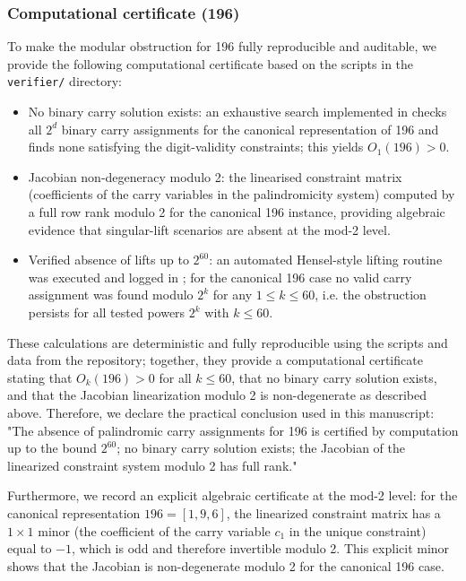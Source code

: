 \documentclass[12pt,a4paper]{article}
\begin{document}
\subsubsection*{Computational certificate (196)}
To make the modular obstruction for 196 fully reproducible and auditable, we provide the following computational certificate based on the scripts in the \texttt{verifier/} directory:
\begin{itemize}
\item No binary carry solution exists: an exhaustive search implemented in \texttt{} checks all $2^d$ binary carry assignments for the canonical representation of 196 and finds none satisfying the digit-validity constraints; this yields $O_1(196)>0$.
\item Jacobian non-degeneracy modulo 2: the linearised constraint matrix (coefficients of the carry variables in the palindromicity system) computed by \texttt{} a full row rank modulo 2 for the canonical 196 instance, providing algebraic evidence that singular-lift scenarios are absent at the mod-2 level.
\item Verified absence of lifts up to $2^{60}$: an automated Hensel-style lifting routine was executed and logged in \texttt{}; for the canonical 196 case no valid carry assignment was found modulo $2^k$ for any $1\le k\le 60$, i.e. the obstruction persists for all tested powers $2^k$ with $k\le 60$.
\end{itemize}

These calculations are deterministic and fully reproducible using the scripts and data from the repository; together, they provide a computational certificate stating that $O_k(196) > 0$ for all $k \leq 60$, that no binary carry solution exists, and that the Jacobian linearization modulo 2 is non-degenerate as described above. Therefore, we declare the practical conclusion used in this manuscript: "The absence of palindromic carry assignments for 196 is certified by computation up to the bound $2^{60}$; no binary carry solution exists; the Jacobian of the linearized constraint system modulo 2 has full rank."

Furthermore, we record an explicit algebraic certificate at the mod-2 level: for the canonical representation $196 = [1, 9, 6]$, the linearized constraint matrix has a $1 \times 1$ minor (the coefficient of the carry variable $c_1$ in the unique constraint) equal to $-1$, which is odd and therefore invertible modulo 2. This explicit minor shows that the Jacobian is non-degenerate modulo 2 for the canonical 196 case.
\end{document}
